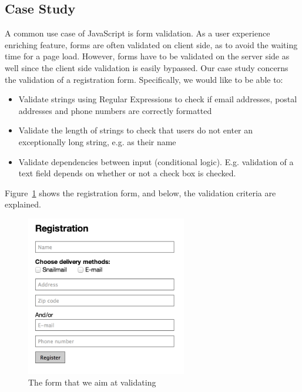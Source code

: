 	\subsection{Case Study}
		A common use case of JavaScript is form validation. As a user experience enriching feature, forms are often validated on client side, as to avoid the waiting time for a page load. However, forms have to be validated on the server side as well since the client side validation is easily bypassed. Our case study concerns the validation of a registration form. Specifically, we would like to be able to:

		\begin{itemize}
			\item Validate strings using Regular Expressions to check if email addresses, postal addresses and phone numbers are correctly formatted
			\item Validate the length of strings to check that users do not enter an exceptionally long string, e.g. as their name
			\item Validate dependencies between input (conditional logic). E.g. validation of a text field depends on whether or not a check box is checked.
		\end{itemize}

		Figure~\ref{registrationForm} shows the registration form, and below, the validation criteria are explained.

		\begin{figure}
			\begin{center}
				\centerline{\includegraphics[width=7cm]{resources/images/registrationform.png}}
			\end{center}
			\caption{The form that we aim at validating}
			\label{registrationForm}
		\end{figure}

